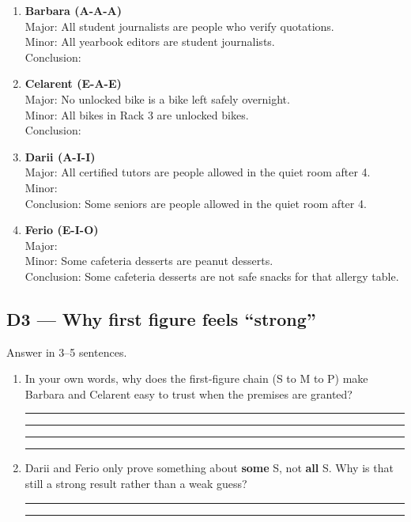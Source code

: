 \documentclass[11pt]{article}
\newcommand{\ansline}{\par\vspace{0.15em}\noindent\rule{\linewidth}{0.4pt}\par\vspace{0.08em}}
\newcommand{\twolines}{\ansline\ansline}
\begin{document}
\begin{enumerate}
\item \textbf{Barbara (A-A-A)}\\
Major: All student journalists are people who verify quotations.\\
Minor: All yearbook editors are student journalists.\\
Conclusion: \underline{\hspace{4.6in}}

\item \textbf{Celarent (E-A-E)}\\
Major: No unlocked bike is a bike left safely overnight.\\
Minor: All bikes in Rack 3 are unlocked bikes.\\
Conclusion: \underline{\hspace{4.6in}}

\item \textbf{Darii (A-I-I)}\\
Major: All certified tutors are people allowed in the quiet room after 4.\\
Minor: \underline{\hspace{4.6in}}\\
Conclusion: Some seniors are people allowed in the quiet room after 4.

\item \textbf{Ferio (E-I-O)}\\
Major: \underline{\hspace{4.6in}}\\
Minor: Some cafeteria desserts are peanut desserts.\\
Conclusion: Some cafeteria desserts are not safe snacks for that allergy table.
\end{enumerate}

\subsection*{D3 --- Why first figure feels ``strong''}
\noindent Answer in 3--5 sentences.

\begin{enumerate}
\item In your own words, why does the first-figure chain (S to M to P) make Barbara and Celarent easy to trust when the premises are granted?
\twolines
\twolines

\item Darii and Ferio only prove something about \textbf{some} S, not \textbf{all} S. Why is that still a strong result rather than a weak guess?
\twolines
\end{enumerate}
\end{document}
